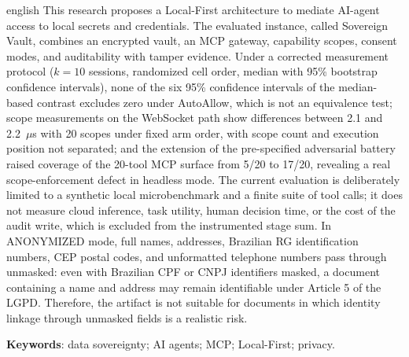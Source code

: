 \begin{resumo}[Abstract]
\begin{otherlanguage*}{english}
This research proposes a Local-First architecture to mediate AI-agent access to local secrets and credentials. The evaluated instance, called Sovereign Vault, combines an encrypted vault, an MCP gateway, capability scopes, consent modes, and auditability with tamper evidence. Under a corrected measurement protocol ($k=10$ sessions, randomized cell order, median with 95\% bootstrap confidence intervals), none of the six 95\% confidence intervals of the median-based contrast excludes zero under AutoAllow, which is not an equivalence test; scope measurements on the WebSocket path show differences between 2.1 and 2.2~$\mu$s with 20 scopes under fixed arm order, with scope count and execution position not separated; and the extension of the pre-specified adversarial battery raised coverage of the 20-tool MCP surface from 5/20 to 17/20, revealing a real scope-enforcement defect in headless mode. The current evaluation is deliberately limited to a synthetic local microbenchmark and a finite suite of tool calls; it does not measure cloud inference, task utility, human decision time, or the cost of the audit write, which is excluded from the instrumented stage sum. In ANONYMIZED mode, full names, addresses, Brazilian RG identification numbers, CEP postal codes, and unformatted telephone numbers pass through unmasked: even with Brazilian CPF or CNPJ identifiers masked, a document containing a name and address may remain identifiable under Article 5 of the LGPD. Therefore, the artifact is not suitable for documents in which identity linkage through unmasked fields is a realistic risk.
\end{otherlanguage*}
\textbf{Keywords}: data sovereignty; AI agents; MCP; Local-First; privacy.
\end{resumo}
\listoffigures*
\cleardoublepage
{}
\listoftables*
\cleardoublepage

